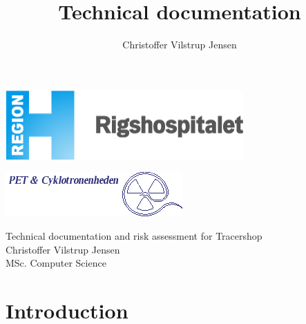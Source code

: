 \documentclass{article}
\author{Christoffer Vilstrup Jensen}
\title{Technical documentation}
\begin{document}
\begin{titlepage}
  \begin{minipage}{0.48\linewidth}
    \includegraphics[width=0.6\linewidth]{logo.png}
  \end{minipage}
  \begin{minipage}{0.48\linewidth}
    \raggedleft
      \includegraphics[width=0.6\linewidth]{petlogo_small.png}
  \end{minipage}
  \vspace{1cm}
  \begin{center}
    \Huge Technical documentation and risk assessment for Tracershop \\
    \vspace{1cm}
    \Large Christoffer Vilstrup Jensen\\
    MSc. Computer Science\\
  \end{center}
\end{titlepage}

\section*{Introduction}
\end{document}

